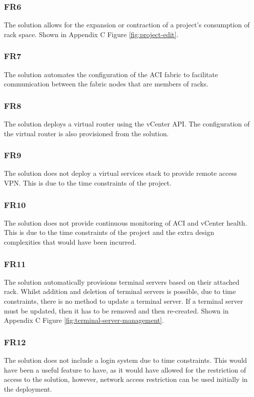 \subsubsection{FR6}
The solution allows for the expansion or contraction of a project's consumption of rack space. Shown in Appendix C Figure \ref{fig:project-edit}.

\subsubsection{FR7}
The solution automates the configuration of the ACI fabric to facilitate communication between the fabric nodes that are members of racks.

\subsubsection{FR8}
The solution deploys a virtual router using the vCenter API. The configuration of the virtual router is also provisioned from the solution.

\subsubsection{FR9}
The solution does not deploy a virtual services stack to provide remote access VPN. This is due to the time constraints of the project.

\subsubsection{FR10}
The solution does not provide continuous monitoring of ACI and vCenter health. This is due to the time constraints of the project and the extra design complexities that would have been incurred.

\subsubsection{FR11}
The solution automatically provisions terminal servers based on their attached rack. Whilst addition and deletion of terminal servers is possible, due to time constraints, there is no method to update a terminal server. If a terminal server must be updated, then it has to be removed and then re-created. Shown in Appendix C Figure \ref{fig:terminal-server-management}.

\subsubsection{FR12}
The solution does not include a login system due to time constraints. This would have been a useful feature to have, as it would have allowed for the restriction of access to the solution, however, network access restriction can be used initially in the deployment.

